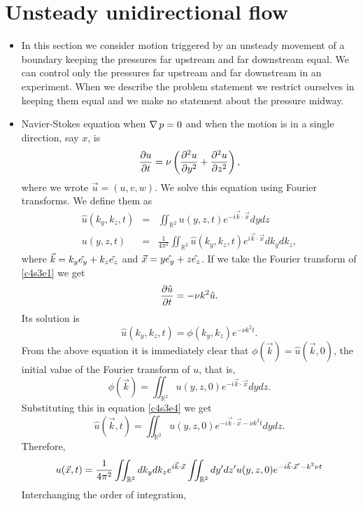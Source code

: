 \section{Unsteady unidirectional flow}\label{c4s3}
\begin{itemize}
\item In this section we consider motion triggered by an unsteady movement of a boundary keeping the pressures
far upstream and far downstream equal. We can control only the pressures far upstream and far downstream in an
experiment. When we describe the problem statement we restrict ourselves in keeping them equal and we make no
statement about the pressure midway.

\item Navier-Stokes equation when $\operatorname{\nabla}{p} = 0$ and when the motion is in a single direction, say $x$, is
\begin{equation}\label{c4s3e1}
\frac{\partial{u}}{\partial{t}} = \nu\left(\frac{\partial^2 u}{\partial y^2} + \frac{\partial^2 u}{\partial z^2}\right),
\end{equation}
where we wrote $\vec{u} = (u, v, w)$. We solve this equation using Fourier transforms. We define them as
\begin{eqnarray}
\hat{u}(k_y, k_z, t) &=&  \iint_{\mathbb{R}^2}u(y, z, t)e^{-i\vec{k}\cdot\vec{x}}dydz \\
u(y, z, t) &=& \frac{1}{4\pi^2}\iint_{\mathbb{R}^2} \hat{u}(k_y, k_z, t)e^{i\vec{k}\cdot\vec{x}}dk_ydk_z,
\end{eqnarray}
where $\vec{k} = k_y\hat{e_{y}} + k_z\hat{e_{z}}$ and $\vec{x} = y\hat{e_{y}} + z\hat{e_{z}}$. If we take the Fourier 
transform of \eqref{c4s3e1} we get
\[
\frac{\partial{\hat{u}}}{\partial{t}} = -\nu k^2 \hat{u}.
\]
Its solution is 
\begin{equation}\label{c4s3e4}
\hat{u}(k_y, k_z, t) = \phi(k_y, k_z)e^{-\nu k^2 t}.
\end{equation}
From the above equation it is immediately clear that $\phi(\vec{k}) = \hat{u}(\vec{k}, 0)$, the initial value of
the Fourier transform of $u$, that is,
\[
\phi(\vec{k}) = \iint_{\mathbb{R}^2} u(y, z, 0)e^{-i\vec{k}\cdot\vec{x}}dydz.
\]
Substituting this in equation \eqref{c4s3e4} we get
\[
\hat{u}(\vec{k}, t) = \iint_{\mathbb{R}^2} u(y, z, 0)e^{-i\vec{k}\cdot\vec{x} - \nu k^2t}dydz.
\]
Therefore,
\[
u(\vec{x},t)=\frac{1}{4\pi^2}\iint_{\mathbb{R}^2} dk_ydk_z e^{i\vec{k}\cdot\vec{x}}\iint_{\mathbb{R}^2} dy^\prime dz^\prime u(y, z, 0) e^{-i\vec{k}\cdot\vec{x}^\prime - k^2\nu t}
\]
Interchanging the order of integration,
\begin{equation}\label{c4s3e5}

\end{equation}
\end{itemize}
